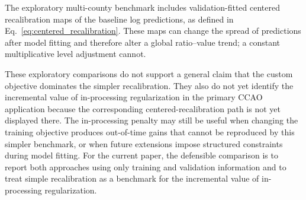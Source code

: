 \documentclass[10pt]{article}
\theoremstyle{definition}
\newcommand{\1}{\mathbf{1}}
\newcommand{\oldtext}[1]{\textcolor{blue}{\sout{#1}}}
\newcommand{\newtext}[1]{\textcolor{impGreen}{#1}}
\begin{document}
\newtext{The exploratory multi-county benchmark includes validation-fitted centered recalibration maps of the baseline log predictions, as defined in Eq.~\eqref{eq:centered_recalibration}. These maps can change the spread of predictions after model fitting and therefore alter a global ratio--value trend; a constant multiplicative level adjustment cannot.}

\newtext{These exploratory comparisons do not support a general claim that the custom objective dominates the simpler recalibration. They also do not yet identify the incremental value of in-processing regularization in the primary CCAO application because the corresponding centered-recalibration path is not yet displayed there. The in-processing penalty may still be useful when changing the training objective produces out-of-time gains that cannot be reproduced by this simpler benchmark, or when future extensions impose structured constraints during model fitting.}
\newtext{For the current paper, the defensible comparison is to report both approaches using only training and validation information and to treat simple recalibration as a benchmark for the incremental value of in-processing regularization.}

\end{document}
